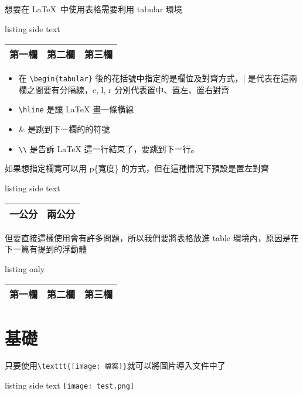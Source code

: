想要在 \LaTeX\ 中使用表格需要利用 tabular 環境

\begin{tcblisting}{listing side text}
\begin{tabular}{| c | l r |}
\hline
第一欄 & 第二欄 & 第三欄 \\
\hline
\end{tabular}
\end{tcblisting}

\begin{itemize}
\item 在 \verb|\begin{tabular}| 後的花括號中指定的是欄位及對齊方式，| 是代表在這兩欄之間要有分隔線，c, l, r 分別代表置中、置左、置右對齊
\item \verb|\hline| 是讓 LaTeX 畫一條橫線
\item \& 是跳到下一欄的的符號
\item \verb|\\| 是告訴 LaTeX 這一行結束了，要跳到下一行。
\end{itemize}

如果想指定欄寬可以用 p\{寬度\} 的方式，但在這種情況下預設是置左對齊

\begin{tcblisting}{listing side text}
\begin{tabular}{|p{1cm}|p{2cm}|}
\hline
一公分 & 兩公分 \\
\hline
\end{tabular}
\end{tcblisting}

但要直接這樣使用會有許多問題，所以我們要將表格放進 table 環境內，原因是在下一篇有提到的浮動體

\begin{tcblisting}{listing only}
\begin{table}
\begin{tabular}{| c | l r |}
\hline
第一欄 & 第二欄 & 第三欄 \\
\hline
\end{tabular}
\end{table}
\end{tcblisting}

\section{基礎}

只要使用\verb|\texttt{[image: 檔案]}|就可以將圖片導入文件中了

\begin{tcblisting}{listing side text}
\texttt{[image: test.png]}
\end{tcblisting}

